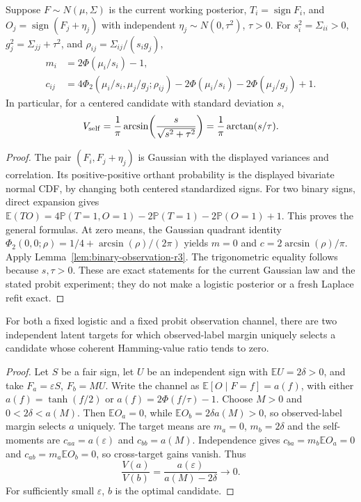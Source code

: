 \begin{proposition}
\label{prop:gaussian-probit-r3}
Suppose $F\sim N(\mu,\Sigma)$ is the current working posterior,
$T_i=\operatorname{sign}F_i$, and
$O_j=\operatorname{sign}(F_j+\eta_j)$ with independent
$\eta_j\sim N(0,\tau^2)$, $\tau>0$. For $s_i^2=\Sigma_{ii}>0$,
$g_j^2=\Sigma_{jj}+\tau^2$, and
$\rho_{ij}=\Sigma_{ij}/(s_i g_j)$,
\begin{align*}
 m_i&=2\Phi(\mu_i/s_i)-1,\\
 c_{ij}
 &=4\Phi_2(\mu_i/s_i,\mu_j/g_j;\rho_{ij})
   -2\Phi(\mu_i/s_i)-2\Phi(\mu_j/g_j)+1.
\end{align*}
In particular, for a centered candidate with standard deviation $s$,
\[
 V_{\rm self}
 =\frac1\pi\arcsin\!\left(\frac{s}{\sqrt{s^2+\tau^2}}\right)
 =\frac1\pi\arctan(s/\tau).
\]
\end{proposition}
\begin{proof}
The pair $(F_i,F_j+\eta_j)$ is Gaussian with the displayed variances and
correlation. Its positive-positive orthant probability is the displayed
bivariate normal CDF, by changing both centered standardized signs.
For two binary signs, direct expansion gives
$\mathbb{E}(TO)=4\mathbb{P}(T=1,O=1)-2\mathbb{P}(T=1)
-2\mathbb{P}(O=1)+1$. This proves the general formulas.
At zero means, the Gaussian quadrant identity
$\Phi_2(0,0;\rho)=1/4+\arcsin(\rho)/(2\pi)$ yields
$m=0$ and $c=2\arcsin(\rho)/\pi$. Apply
Lemma~\ref{lem:binary-observation-r3}. The trigonometric equality follows
because $s,\tau>0$. These are exact statements for the current Gaussian
law and the stated probit experiment; they do not make a logistic
posterior or a fresh Laplace refit exact.
\end{proof}

\begin{counterexample}
\label{ce:logistic-margin-r3}
For both a fixed logistic and a fixed probit observation channel, there
are two independent latent targets for which observed-label margin
uniquely selects a candidate whose coherent Hamming-value ratio tends
to zero.
\end{counterexample}
\begin{proof}
Let $S$ be a fair sign, let $U$ be an independent sign with
$\mathbb{E}U=2\delta>0$, and take
$F_a=\varepsilon S$, $F_b=M U$. Write the channel as
$\mathbb{E}[O\mid F=f]=a(f)$, with either
$a(f)=\tanh(f/2)$ or $a(f)=2\Phi(f/\tau)-1$.
Choose $M>0$ and $0<2\delta<a(M)$. Then
$\mathbb{E}O_a=0$, while $\mathbb{E}O_b=2\delta a(M)>0$,
so observed-label margin selects $a$ uniquely.
The target means are $m_a=0$, $m_b=2\delta$ and the self-moments are
$c_{aa}=a(\varepsilon)$ and $c_{bb}=a(M)$.
Independence gives
$c_{ba}=m_b\mathbb{E}O_a=0$ and
$c_{ab}=m_a\mathbb{E}O_b=0$, so cross-target gains vanish. Thus
\[
 \frac{V(a)}{V(b)}
 =\frac{a(\varepsilon)}{a(M)-2\delta}\longrightarrow0.
\]
For sufficiently small $\varepsilon$, $b$ is the optimal candidate.
\end{proof}

